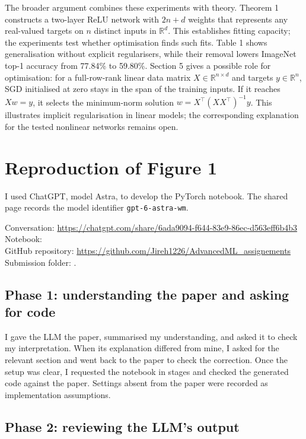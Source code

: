 \documentclass[11pt]{article}
\begin{document}
The broader argument combines these experiments with theory. Theorem 1 constructs a two-layer ReLU network with $2n+d$ weights that represents any real-valued targets on $n$ distinct inputs in $\mathbb{R}^d$. This establishes fitting capacity; the experiments test whether optimisation finds such fits. Table 1 shows generalisation without explicit regularisers, while their removal lowers ImageNet top-1 accuracy from 77.84\% to 59.80\%. Section 5 gives a possible role for optimisation: for a full-row-rank linear data matrix $X\in\mathbb{R}^{n\times d}$ and targets $y\in\mathbb{R}^n$, SGD initialised at zero stays in the span of the training inputs. If it reaches $Xw=y$, it selects the minimum-norm solution $w=X^\top(XX^\top)^{-1}y$. This illustrates implicit regularisation in linear models; the corresponding explanation for the tested nonlinear networks remains open.

\clearpage
\section{Reproduction of Figure 1}

I used ChatGPT, model Astra, to develop the PyTorch notebook. The shared page records the model identifier \texttt{gpt-6-astra-wm}.

\noindent Conversation: \url{https://chatgpt.com/share/6ada9094-f644-83e9-86ec-d563eff6b4b3}\\
Notebook: \\
GitHub repository: \url{https://github.com/Jireh1226/AdvancedML_assignements}\\
Submission folder: .

\subsection{Phase 1: understanding the paper and asking for code}

I gave the LLM the paper, summarised my understanding, and asked it to check my interpretation. When its explanation differed from mine, I asked for the relevant section and went back to the paper to check the correction. Once the setup was clear, I requested the notebook in stages and checked the generated code against the paper. Settings absent from the paper were recorded as implementation assumptions.

\subsection{Phase 2: reviewing the LLM's output}
\end{document}
